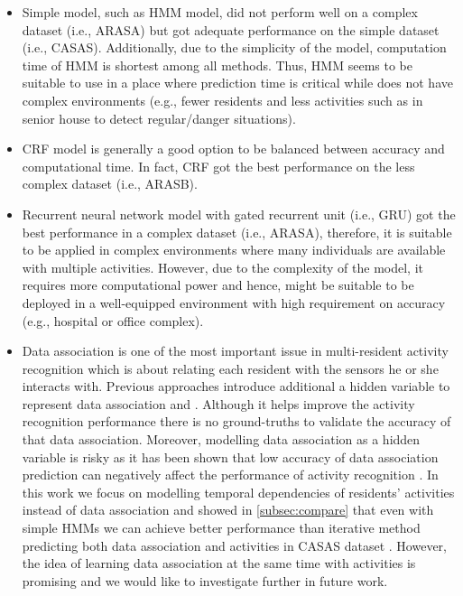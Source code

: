 \begin{itemize}
\item Simple model, such as HMM model, did not perform well on a complex dataset (i.e., ARASA) but got adequate performance on the simple dataset (i.e., CASAS). Additionally, due to the simplicity of the model, computation time of HMM is shortest among all methods. Thus, HMM seems to be suitable to use in a place where prediction time is critical while does not have complex environments (e.g., fewer residents and less activities such as in senior house to detect regular/danger situations).
\item CRF model is generally a good option to be balanced between accuracy and computational time. In fact, CRF got the best performance on the less complex dataset (i.e., ARASB).
\item Recurrent neural network model with gated recurrent unit (i.e., GRU) got the best performance in a complex dataset (i.e., ARASA), therefore, it is suitable to be applied in complex environments where many individuals are available with multiple activities. However, due to the complexity of the model, it requires more computational power and hence, might be suitable to be deployed in a well-equipped environment with high requirement on accuracy (e.g., hospital or office complex).

\item Data association is one of the most important issue in multi-resident activity recognition which is about relating each resident with the sensors he or she interacts with. Previous approaches introduce additional a hidden variable to represent data association and  \cite{Wilson_2005,Hsu_2010}. Although it helps improve the activity recognition performance there is no ground-truths to validate the accuracy of that data association. Moreover, modelling data association as a hidden variable is risky as it has been shown that low accuracy of data association prediction can negatively affect the performance of activity recognition \cite{Hsu_2010}. In this work we focus on modelling temporal dependencies of residents' activities instead of data association and showed in \ref{subsec:compare} that even with simple HMMs we can achieve better performance than iterative method predicting both data association and activities in CASAS dataset \cite{Hsu_2010}. However, the idea of learning data association at the same time with activities is promising and we would like to investigate further in future work. 
\end{itemize}

